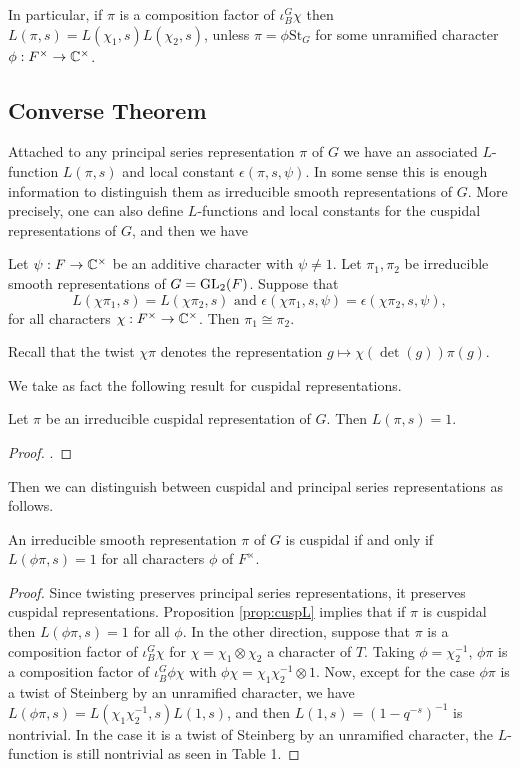 In particular, if $\pi$ is a composition factor of $\iota_B^G \chi$ then $L(\pi,s) = L(\chi_1,s)L(\chi_2,s)$, unless $\pi = \phi \mathrm{St}_G$ for some unramified character $\phi : F^\times \to \mathbb{C}^\times$.

\subsection{Converse Theorem}

Attached to any principal series representation $\pi$ of $G$ we have an associated $L$-function $L(\pi,s)$ and local constant $\epsilon(\pi,s,\psi)$. In some sense this is enough information to distinguish them as irreducible smooth representations of $G$. More precisely, one can also define $L$-functions and local constants for the cuspidal representations of $G$, and then we have

\begin{thm}\label{thm:converse}
    Let $\psi:F \to \mathbb{C}^\times$ be an additive character with $\psi \neq 1$. Let $\pi_1,\pi_2$ be irreducible smooth representations of $G=\mathrm{GL}_2(F)$. Suppose that 
    $$L(\chi\pi_1,s)=L(\chi\pi_2,s) \text{   and   } \epsilon(\chi\pi_1,s,\psi) = \epsilon(\chi\pi_2,s,\psi),$$ for all characters $\chi :F^\times \to \mathbb{C}^\times$. Then $\pi_1 \cong \pi_2$.
\end{thm}

Recall that the twist $\chi\pi$ denotes the representation $g \mapsto \chi(\det(g))\pi(g)$.

We take as fact the following result for cuspidal representations.

\begin{prop}\label{prop:cuspL}
    Let $\pi$ be an irreducible cuspidal representation of $G$. Then $L(\pi,s)=1$.
\end{prop}
\begin{proof}
    \cite[Corollary 24.5]{BH1}.
\end{proof}

Then we can distinguish between cuspidal and principal series representations as follows.

\begin{prop}\label{prop:twistL}
    An irreducible smooth  representation $\pi$ of $G$ is cuspidal if and only if $L(\phi\pi,s)=1$ for all characters $\phi$ of $F^\times$.
\end{prop}
\begin{proof}
    Since twisting preserves principal series representations, it preserves cuspidal representations. Proposition \ref{prop:cuspL} implies that if $\pi$ is cuspidal then $L(\phi\pi,s)=1$ for all $\phi$. In the other direction, suppose that $\pi$ is a composition factor of $\iota_B^G \chi$ for $\chi= \chi_1\otimes \chi_2$ a character of $T$. Taking $\phi=\chi_2^{-1}$, $\phi\pi$ is a composition factor of $\iota_B^G \phi\chi$ with $\phi\chi = \chi_1\chi_2^{-1} \otimes 1$. Now, except for the case $\phi\pi$ is a twist of Steinberg by an unramified character, we have $L(\phi\pi,s) = L(\chi_1\chi_2^{-1},s)L(1,s)$, and then $L(1,s)=(1-q^{-s})^{-1}$ is nontrivial. In the case it is a twist of Steinberg by an unramified character, the $L$-function is still nontrivial as seen in Table 1.
\end{proof}

